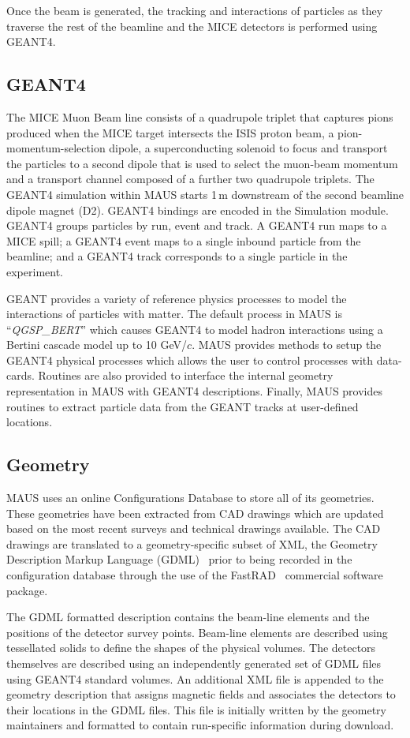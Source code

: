 \documentclass{JINST}
\begin{document}
Once the beam is generated, the tracking and interactions of particles as they traverse the rest of the beamline and the MICE detectors  is performed using GEANT4.

\subsection{GEANT4}\label{sec:geant}
The MICE Muon Beam line consists of a quadrupole triplet that captures pions produced when the MICE target intersects the ISIS proton beam, a pion-momentum-selection dipole, a superconducting solenoid to focus and transport the particles to a second dipole that is used to select the muon-beam momentum and a transport channel composed of a further two quadrupole triplets. The GEANT4 simulation within MAUS starts 1\,m downstream of the second beamline dipole magnet (D2). GEANT4 bindings are encoded in the Simulation module. GEANT4 groups particles by run, event and track. A GEANT4 run maps to a MICE spill; a GEANT4 event maps to a single inbound particle from the beamline; and a GEANT4 track corresponds to a single particle in the experiment.

GEANT provides a variety of reference physics processes to model the interactions of particles with matter. The default process in MAUS is ``\emph{QGSP\_BERT}'' which causes GEANT4 to model hadron interactions using a Bertini cascade model up to 10 GeV/$c$. MAUS provides methods to setup the GEANT4 physical processes which allows the user to control processes with data-cards. Routines are also provided to interface the internal geometry representation in MAUS with GEANT4 descriptions. Finally, MAUS provides routines to extract particle data from the GEANT tracks at user-defined locations.

\subsection{Geometry}\label{sec:geo}

MAUS uses an online Configurations Database to store all of its
geometries. These geometries have been extracted from CAD drawings
which are  updated based on the most recent surveys and technical drawings
available. The CAD drawings are translated to a geometry-specific
subset of XML, the Geometry Description Markup Language (GDML)~\cite{GDML} prior
to being recorded in the configuration database through the use of the 
FastRAD~\cite{fastrad} commercial software package. 

The GDML formatted description contains the beam-line elements and the positions of
the detector survey points. Beam-line elements are described using 
tessellated solids to define the shapes of the physical
volumes. The detectors themselves are described using an independently
generated set of GDML files using GEANT4 standard volumes. An
additional XML file is appended to the geometry description that
assigns magnetic fields and associates the detectors to their
locations in the GDML files. This file is
initially written by the geometry maintainers and formatted to contain
run-specific information during download.
\end{document}
